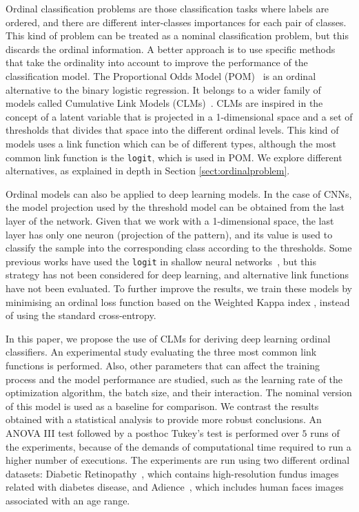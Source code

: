 \documentclass[journal]{IEEEtran}
\begin{document}
	Ordinal classification problems are those classification tasks where labels are ordered, and there are different inter-classes importances for each pair of classes. This kind of problem can be treated as a nominal classification problem, but this discards the ordinal information. A better approach is to use specific methods that take the ordinality into account to improve the performance of the classification model. The Proportional Odds Model (POM)~\cite{mccullagh1980regression} is an ordinal alternative to the binary logistic regression. It belongs to a wider family of models called Cumulative Link Models (CLMs)~\cite{agresti2010analysis}. CLMs are inspired in the concept of a latent variable that is projected in a 1-dimensional space and a set of thresholds that divides that space into the different ordinal levels. This kind of models uses a link function which can be of different types, although the most common link function is the \texttt{logit}, which is used in POM. We explore different alternatives, as explained in depth in Section \ref{sect:ordinalproblem}.
	
	Ordinal models can also be applied to deep learning models. In the case of CNNs, the model projection used by the threshold model can be obtained from the last layer of the network. Given that we work with a 1-dimensional space, the last layer has only one neuron (projection of the pattern), and its value is used to classify the sample into the corresponding class according to the thresholds. Some previous works have used the \texttt{logit} in shallow neural networks~\cite{gutierrez2016ordinal}, but this strategy has not been considered for deep learning, and alternative link functions have not been evaluated. To further improve the results, we train these models by minimising an ordinal loss function based on the Weighted Kappa index \cite{de2018weighted}, instead of using the standard cross-entropy.
	
	In this paper, we propose the use of CLMs for deriving deep learning ordinal classifiers. An experimental study evaluating the three most common link functions is performed. Also, other parameters that can affect the training process and the model performance are studied, such as the learning rate of the optimization algorithm, the batch size, and their interaction. The nominal version of this model is used as a baseline for comparison. We contrast the results obtained with a statistical analysis to provide more robust conclusions. An ANOVA III test \cite{miller1997beyond} followed by a posthoc Tukey's test \cite{tukey1949comparing} is performed over $5$ runs of the experiments, because of the demands of computational time required to run a higher number of executions. The experiments are run using two different ordinal datasets: Diabetic Retinopathy~\cite{de2018weighted}, which contains high-resolution fundus images related with diabetes disease, and Adience~\cite{beckham2017unimodal}, which includes human faces images associated with an age range.
	
\end{document}
